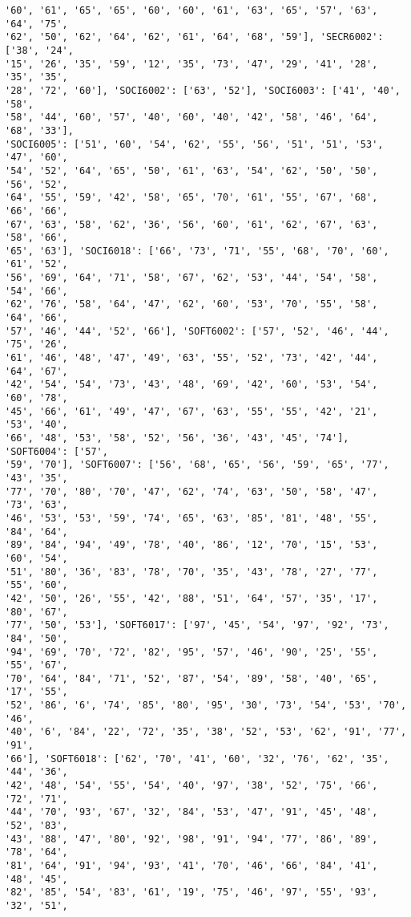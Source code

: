 \documentclass[11pt]{article}
\begin{document}
\begin{Verbatim}[commandchars=\\\{\}]
'60', '61', '65', '65', '60', '60', '61', '63', '65', '57', '63', '64', '75',
'62', '50', '62', '64', '62', '61', '64', '68', '59'], 'SECR6002': ['38', '24',
'15', '26', '35', '59', '12', '35', '73', '47', '29', '41', '28', '35', '35',
'28', '72', '60'], 'SOCI6002': ['63', '52'], 'SOCI6003': ['41', '40', '58',
'58', '44', '60', '57', '40', '60', '40', '42', '58', '46', '64', '68', '33'],
'SOCI6005': ['51', '60', '54', '62', '55', '56', '51', '51', '53', '47', '60',
'54', '52', '64', '65', '50', '61', '63', '54', '62', '50', '50', '56', '52',
'64', '55', '59', '42', '58', '65', '70', '61', '55', '67', '68', '66', '66',
'67', '63', '58', '62', '36', '56', '60', '61', '62', '67', '63', '58', '66',
'65', '63'], 'SOCI6018': ['66', '73', '71', '55', '68', '70', '60', '61', '52',
'56', '69', '64', '71', '58', '67', '62', '53', '44', '54', '58', '54', '66',
'62', '76', '58', '64', '47', '62', '60', '53', '70', '55', '58', '64', '66',
'57', '46', '44', '52', '66'], 'SOFT6002': ['57', '52', '46', '44', '75', '26',
'61', '46', '48', '47', '49', '63', '55', '52', '73', '42', '44', '64', '67',
'42', '54', '54', '73', '43', '48', '69', '42', '60', '53', '54', '60', '78',
'45', '66', '61', '49', '47', '67', '63', '55', '55', '42', '21', '53', '40',
'66', '48', '53', '58', '52', '56', '36', '43', '45', '74'], 'SOFT6004': ['57',
'59', '70'], 'SOFT6007': ['56', '68', '65', '56', '59', '65', '77', '43', '35',
'77', '70', '80', '70', '47', '62', '74', '63', '50', '58', '47', '73', '63',
'46', '53', '53', '59', '74', '65', '63', '85', '81', '48', '55', '84', '64',
'89', '84', '94', '49', '78', '40', '86', '12', '70', '15', '53', '60', '54',
'51', '80', '36', '83', '78', '70', '35', '43', '78', '27', '77', '55', '60',
'42', '50', '26', '55', '42', '88', '51', '64', '57', '35', '17', '80', '67',
'77', '50', '53'], 'SOFT6017': ['97', '45', '54', '97', '92', '73', '84', '50',
'94', '69', '70', '72', '82', '95', '57', '46', '90', '25', '55', '55', '67',
'70', '64', '84', '71', '52', '87', '54', '89', '58', '40', '65', '17', '55',
'52', '86', '6', '74', '85', '80', '95', '30', '73', '54', '53', '70', '46',
'40', '6', '84', '22', '72', '35', '38', '52', '53', '62', '91', '77', '91',
'66'], 'SOFT6018': ['62', '70', '41', '60', '32', '76', '62', '35', '44', '36',
'42', '48', '54', '55', '54', '40', '97', '38', '52', '75', '66', '72', '71',
'44', '70', '93', '67', '32', '84', '53', '47', '91', '45', '48', '52', '83',
'43', '88', '47', '80', '92', '98', '91', '94', '77', '86', '89', '78', '64',
'81', '64', '91', '94', '93', '41', '70', '46', '66', '84', '41', '48', '45',
'82', '85', '54', '83', '61', '19', '75', '46', '97', '55', '93', '32', '51',

\end{Verbatim}
\end{document}
